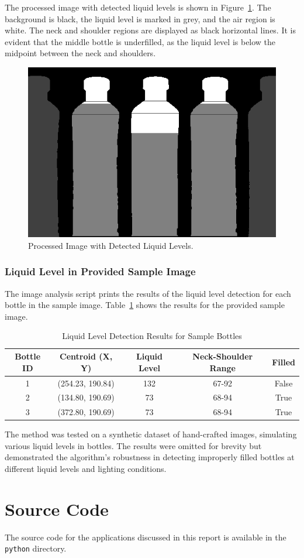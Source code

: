 \documentclass[a4paper,12pt]{article}
\begin{document}
The processed image with detected liquid levels is shown in Figure~\ref{fig:bottle_processed}. The background is black, the liquid level is marked in grey, and the air region is white. The neck and shoulder regions are displayed as black horizontal lines. It is evident that the middle bottle is underfilled, as the liquid level is below the midpoint between the neck and shoulders.

\begin{figure}[!htbp]
    \centering
    \includegraphics[width=0.5\linewidth]{data/output/filled_bottles/final_image.png}
    \caption{Processed Image with Detected Liquid Levels.}
    \label{fig:bottle_processed}
\end{figure}

\subsubsection{Liquid Level in Provided Sample Image}

The image analysis script prints the results of the liquid level detection for each bottle in the sample image. Table~\ref{tab:bottle_results} shows the results for the provided sample image.

\begin{table}[!htbp]
    \centering
    \caption{Liquid Level Detection Results for Sample Bottles}
    \label{tab:bottle_results}
    \begin{tabular}{|c|c|c|c|c|}
        \hline
        \textbf{Bottle ID} & \textbf{Centroid (X, Y)} & \textbf{Liquid Level} & \textbf{Neck-Shoulder Range} & \textbf{Filled} \\
        \hline
        1 & (254.23, 190.84) & 132 & 67-92 & False \\
        2 & (134.80, 190.69) & 73 & 68-94 & True \\
        3 & (372.80, 190.69) & 73 & 68-94 & True \\
        \hline
    \end{tabular}
\end{table}

The method was tested on a synthetic dataset of hand-crafted images, simulating various liquid levels in bottles. The results were omitted for brevity but demonstrated the algorithm's robustness in detecting improperly filled bottles at different liquid levels and lighting conditions.

\section{Source Code}

The source code for the applications discussed in this report is available in the \texttt{python} directory.
\end{document}
